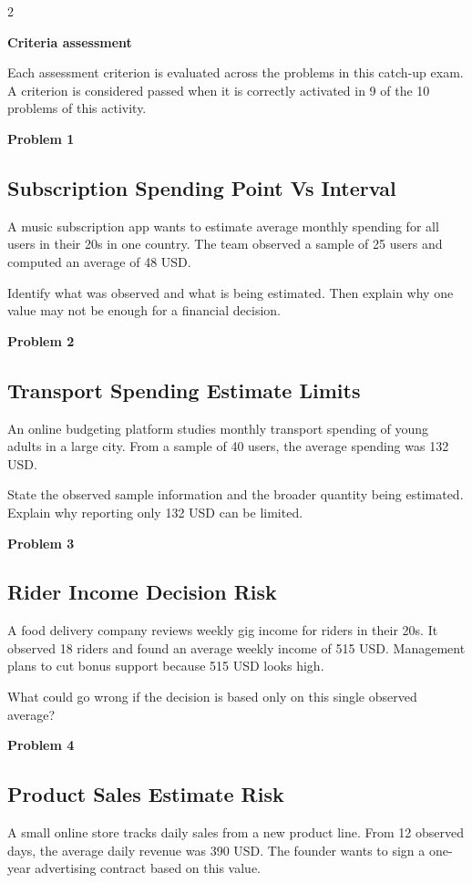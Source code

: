 \documentclass[12pt]{article}
\newcommand{\SubsectionBox}[1]{%
\noindent\colorbox{gray!30}{\parbox{\linewidth}{\textbf{#1}}}\par\vspace{0.35cm}%
}
\begin{document}
\begin{multicols}{2}
	\SubsectionBox{Criteria assessment}\vspace{-0.25cm}
	Each assessment criterion is evaluated across the problems in this catch-up exam. A criterion is considered passed when it is correctly activated in 9 of the 10 problems of this activity.

	\vspace{0.25cm}
\SubsectionBox{Problem 1}
\subsection*{Subscription Spending Point Vs Interval}
A music subscription app wants to estimate average monthly spending for all users in their 20s in one country.
		The team observed a sample of 25 users and computed an average of 48 USD.

		Identify what was observed and what is being estimated.
		Then explain why one value may not be enough for a financial decision.

\vspace{0.5cm}
\SubsectionBox{Problem 2}
\subsection*{Transport Spending Estimate Limits}
An online budgeting platform studies monthly transport spending of young adults in a large city.
		From a sample of 40 users, the average spending was 132 USD.

		State the observed sample information and the broader quantity being estimated.
		Explain why reporting only 132 USD can be limited.

\vspace{0.5cm}
\SubsectionBox{Problem 3}
\subsection*{Rider Income Decision Risk}
A food delivery company reviews weekly gig income for riders in their 20s.
		It observed 18 riders and found an average weekly income of 515 USD.
		Management plans to cut bonus support because 515 USD looks high.

		What could go wrong if the decision is based only on this single observed average?

\vspace{0.5cm}
\SubsectionBox{Problem 4}
\subsection*{Product Sales Estimate Risk}
A small online store tracks daily sales from a new product line.
		From 12 observed days, the average daily revenue was 390 USD.
		The founder wants to sign a one-year advertising contract based on this value.


\end{multicols}
\end{document}
